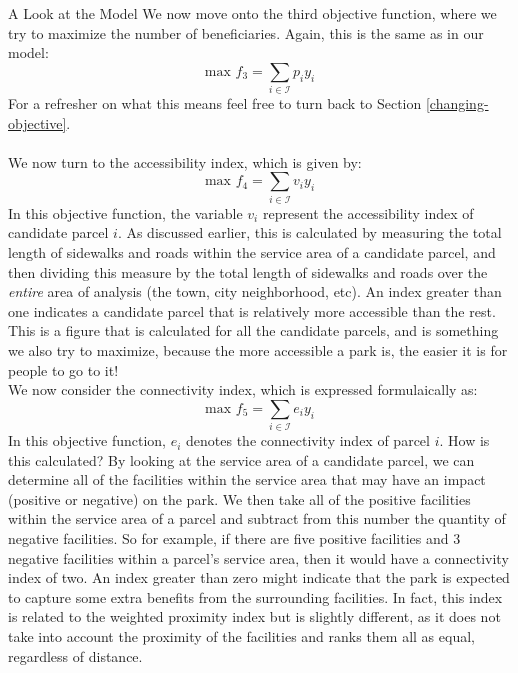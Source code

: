 \documentclass[12pt]{pom_thesis}
\theoremstyle{definition}
\begin{document}
\begin{chapter}{A Look at the Model}
We now move onto the third objective function, where we try to maximize the number of beneficiaries. Again, this is the same as in our model:
\begin{equation} \label{objective-3}
\textrm{max } f_3 = \sum_{i \in \mathcal{I}} p_iy_i
\end{equation}
For a refresher on what this means feel free to turn back to Section \ref{changing-objective}. \\ \\
%
We now turn to the accessibility index, which is given by:
\begin{equation} \label{objective-4}
\textrm{max } f_4 = \sum_{i \in \mathcal{I}} v_iy_i
\end{equation}
In this objective function, the variable $v_i$ represent the accessibility index of candidate parcel $i$. As discussed earlier, this is calculated by measuring the total length of sidewalks and roads within the service area of a candidate parcel, and then dividing this measure by the total length of sidewalks and roads over the \textit{entire} area of analysis (the town, city neighborhood, etc). An index greater than one indicates a candidate parcel that is relatively more accessible than the rest.  This is a figure that is calculated for all the candidate parcels, and is something we also try to maximize, because the more accessible a park is, the easier it is for people to go to it! \\

We now consider the connectivity index, which is expressed formulaically as:
\begin{equation} \label{objective-5}
\textrm{max } f_5 = \sum_{i \in \mathcal{I}} e_iy_i
\end{equation}
In this objective function, $e_i$ denotes the connectivity index of parcel $i$. How is this calculated? By looking at the service area of a candidate parcel, we can determine all of the facilities within the service area that may have an impact (positive or negative) on the park. We then take all of the positive facilities within the service area of a parcel and subtract from this number the quantity of negative facilities. So for example, if there are five positive facilities and 3 negative facilities within a parcel's service area, then it would have a connectivity index of two. An index greater than zero might indicate that the park is expected to capture some extra benefits from the surrounding facilities. In fact, this index is related to the weighted proximity index but is slightly different, as it does not take into account the proximity of the facilities and ranks them all as equal, regardless of distance. \\


\end{chapter}
\end{document}
